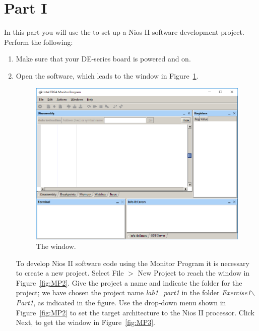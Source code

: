 \documentclass[epsfig,10pt,fullpage]{article}
\begin{document}
\section*{Part I}
In this part you will use the \productNameMed{} to set up a Nios II software development
project.  Perform the following:
\begin{enumerate}
\item Make sure that your DE-series board is powered and on.
\item Open the \productNameMed{} software, which leads to the window in Figure~\ref{fig:MP1}.

\begin{figure}[H]
	\begin{center}
	\includegraphics[scale=.45]{figures/figureMP1.png}
	\end{center}
	\caption{The \productNameMed{} window.}
\label{fig:MP1}
\end{figure}

To develop Nios II software code using the Monitor Program it is necessary to create a new 
project.  Select {\sf File $>$ New Project} to reach the window in Figure~\ref{fig:MP2}.
Give the project a name and indicate the folder for the project; 
we have chosen the project name {\it lab1\_part1} in the folder {\it
Exercise1$\backslash$Part1}, as indicated in the figure. Use the drop-down menu 
shown in Figure~\ref{fig:MP2} to set the target architecture to the Nios II processor.
Click {\sf Next}, to get the window in Figure~\ref{fig:MP3}.


\end{enumerate}
\end{document}
